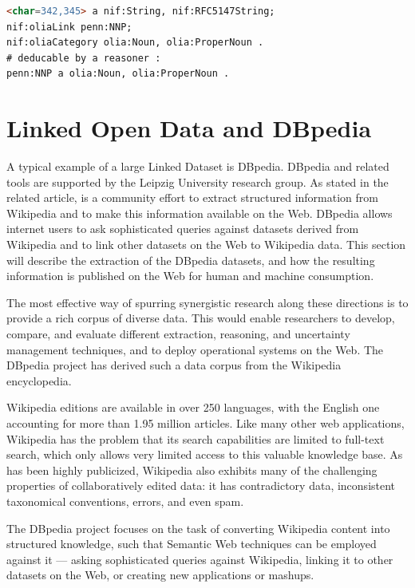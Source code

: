 \documentclass[thesis=M,english,hidelinks]{FITthesis}[2019/12/23]
\begin{document}
\begin{lstlisting}[language=HTML, caption=Example of Internationalization Tag Set HTML Code, label = {lst:olia-example}]
<char=342,345> a nif:String, nif:RFC5147String;
nif:oliaLink penn:NNP;
nif:oliaCategory olia:Noun, olia:ProperNoun .
# deducable by a reasoner :
penn:NNP a olia:Noun, olia:ProperNoun .
\end{lstlisting}


\section{Linked Open Data and DBpedia}

A typical example of a large Linked Dataset is DBpedia. DBpedia and related tools are supported by the Leipzig University research group. As stated in the related article, is a community effort to extract structured information from Wikipedia and to make this information available on the Web. DBpedia allows internet users to ask sophisticated queries against datasets derived from Wikipedia and to link other datasets on the Web to Wikipedia data. This section will describe the extraction of the DBpedia datasets, and how the resulting information is published on the Web for human and machine consumption\cite{dbpedia_nucleus}.

The most effective way of spurring synergistic research along these directions is to provide a rich corpus of diverse data. This would enable researchers to develop, compare, and evaluate different extraction, reasoning, and uncertainty management techniques, and to deploy operational systems on the Web. The DBpedia project has derived such a data corpus from the Wikipedia encyclopedia.

Wikipedia editions are available in over 250 languages, with the English one accounting for more than 1.95 million articles. Like many other web applications, Wikipedia has the problem that its search capabilities are limited to full-text search, which only allows very limited access to this valuable knowledge base. As has been highly publicized, Wikipedia also exhibits many of the challenging properties of collaboratively edited data: it has contradictory data, inconsistent taxonomical conventions, errors, and even spam. 

The DBpedia project focuses on the task of converting Wikipedia content into structured knowledge, such that Semantic Web techniques can be employed against it — asking sophisticated queries against Wikipedia, linking it to other datasets on the Web, or creating new applications or mashups.
\end{document}
